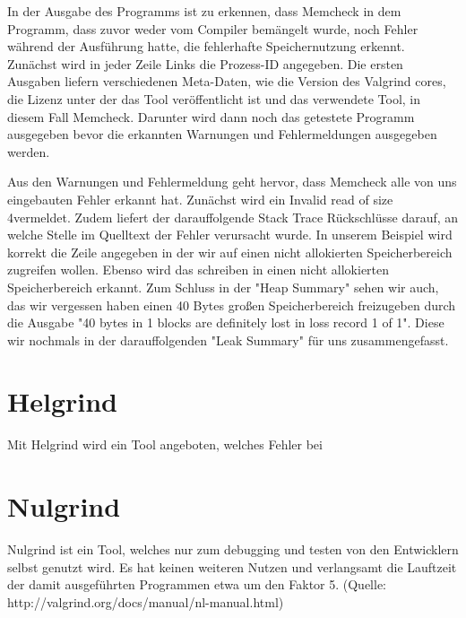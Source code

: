 In der Ausgabe des Programms ist zu erkennen, dass Memcheck in dem Programm, dass zuvor weder vom Compiler bemängelt wurde, noch Fehler während der Ausführung hatte, die fehlerhafte Speichernutzung erkennt.
Zunächst wird in jeder Zeile Links die Prozess-ID angegeben. Die ersten Ausgaben liefern verschiedenen Meta-Daten, wie die Version des Valgrind cores, die Lizenz unter der das Tool veröffentlicht ist und das verwendete Tool, in diesem Fall Memcheck. Darunter wird dann noch das getestete Programm ausgegeben bevor die erkannten Warnungen und Fehlermeldungen ausgegeben werden. 

Aus den Warnungen und Fehlermeldung geht hervor, dass Memcheck alle von uns eingebauten Fehler erkannt hat. Zunächst wird ein \glqq Invalid read of size 4\grqq  vermeldet. Zudem liefert der darauffolgende Stack Trace Rückschlüsse darauf, an welche Stelle im Quelltext der Fehler verursacht wurde. In unserem Beispiel wird korrekt die Zeile angegeben in der wir auf einen nicht allokierten Speicherbereich zugreifen wollen. Ebenso wird das schreiben in einen nicht allokierten Speicherbereich erkannt. Zum Schluss in der "Heap Summary" sehen wir auch, das wir vergessen haben einen 40 Bytes großen Speicherbereich freizugeben durch die Ausgabe "40 bytes in 1 blocks are definitely lost in loss record 1 of 1". Diese wir nochmals in der darauffolgenden "Leak Summary" für uns zusammengefasst.

\section{Helgrind}
Mit Helgrind wird ein Tool angeboten, welches Fehler bei 

\section{Nulgrind}
Nulgrind ist ein Tool, welches nur zum debugging und testen von den Entwicklern selbst genutzt wird. Es hat keinen weiteren Nutzen und verlangsamt die Lauftzeit der damit ausgeführten Programmen etwa um den Faktor 5. (Quelle: http://valgrind.org/docs/manual/nl-manual.html)